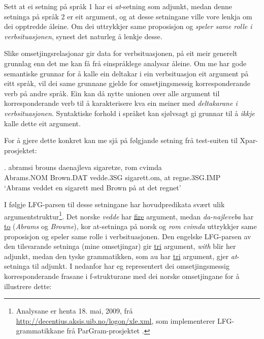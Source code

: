 \documentclass[11pt,a4paper,oneside,draft]{report}
\begin{document}
Sett at ei setning på språk 1 har ei \emph{at}-setning som adjunkt, medan
denne setninga på språk 2 er eit argument, og at desse setningane
ville vore lenkja om dei opptredde åleine. Om dei uttrykkjer same
proposisjon og \emph{speler same rolle i verbsituasjonen}, synest det
naturleg å lenkje desse.

Slike omsetjingsrelasjonar gir data for verbsituasjonen, på eit meir
generelt grunnlag enn det me kan få frå einspråklege analysar
åleine. Om me har gode semantiske grunnar for å kalle ein deltakar i
ein verbsituasjon eit argument på eitt språk, vil dei same grunnane
gjelde for omsetjingsmessig korresponderande verb på andre språk. Ein
kan då nytte unionen over alle argument til korresponderande verb til
å karakterisere kva ein meiner med \emph{deltakarane i verbsituasjonen}. Syntaktiske forhold i språket kan sjølvsagt gi
grunnar til å \emph{ikkje} kalle dette eit argument.

For å gjere dette konkret kan me sjå på følgjande setning frå
test-suiten til Xpar-prosjektet:

\exg. abramsi brouns       daenajleva sigaretze, rom cvimda \label{ex:vedde-gloss} \\
      Abrams.NOM Brown.DAT vedde.3SG sigarett.om, at  regne.3SG.IMP \\
     `Abrams veddet en sigarett med Brown på at det regnet' 

I følgje LFG-parsen til desse setningane har hovudpredikata svært ulik
argumentstruktur\footnote{Analysane er henta 18. mai, 2009, frå
        \href{http://decentius.aksis.uib.no/logon/xle.xml}{http://decentius.aksis.uib.no/logon/xle.xml}, som implementerer
        LFG-grammatikkane frå ParGram-prosjektet \citep{butt2002pgp}. }. Det norske \emph{vedde} har \underline{fire} argument, medan
\emph{da-najleveba} har \underline{to} (\emph{Abrams} og \emph{Browne}), kor at-setninga på
norsk og \emph{rom cvimda} uttrykkjer same proposisjon og speler same rolle
i verbsituasjonen. Den engelske LFG-parsen av den tilsvarande setninga
(mine omsetjingar) gir \underline{tri} argument, \emph{with} blir her adjunkt, medan
den tyske grammatikken, som au har \underline{tri} argument, gjer \emph{at}-setninga
til adjunkt. I \Next nedanfor har eg representert dei omsetjingsmessig
korresponderande frasane i f-strukturane med dei norske omsetjingane
for å illustrere dette:
\end{document}
